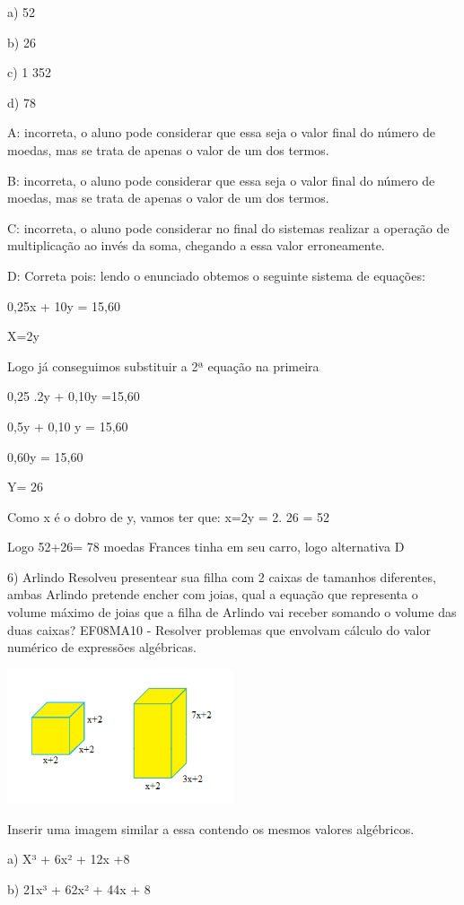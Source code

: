 {a) 52

b) 26

c) 1 352

d) 78

A: incorreta, o aluno pode considerar que essa seja o valor final do
número de moedas, mas se trata de apenas o valor de um dos termos.

B: incorreta, o aluno pode considerar que essa seja o valor final do
número de moedas, mas se trata de apenas o valor de um dos termos.

C: incorreta, o aluno pode considerar no final do sistemas realizar a
operação de multiplicação ao invés da soma, chegando a essa valor
erroneamente.

D: Correta pois: lendo o enunciado obtemos o seguinte sistema de
equações:

0,25x + 10y = 15,60

X=2y

Logo já conseguimos substituir a 2ª equação na primeira

0,25 .2y + 0,10y =15,60

0,5y + 0,10 y = 15,60

0,60y = 15,60

Y= 26

Como x é o dobro de y, vamos ter que: x=2y = 2. 26 = 52

Logo 52+26= 78 moedas Frances tinha em seu carro, logo alternativa D

6) Arlindo Resolveu presentear sua filha com 2 caixas de tamanhos
diferentes, ambas Arlindo pretende encher com joias, qual a equação que
representa o volume máximo de joias que a filha de Arlindo vai receber
somando o volume das duas caixas? EF08MA10 - Resolver problemas que
envolvam cálculo do valor numérico de expressões algébricas.

\includegraphics[width=2.63333in,height=1.56545in]{./imgSAEB_8_MAT/media/image55.png}

Inserir uma imagem similar a essa contendo os mesmos valores algébricos.

a) X³ + 6x² + 12x +8

b) 21x³ + 62x² + 44x + 8

}
